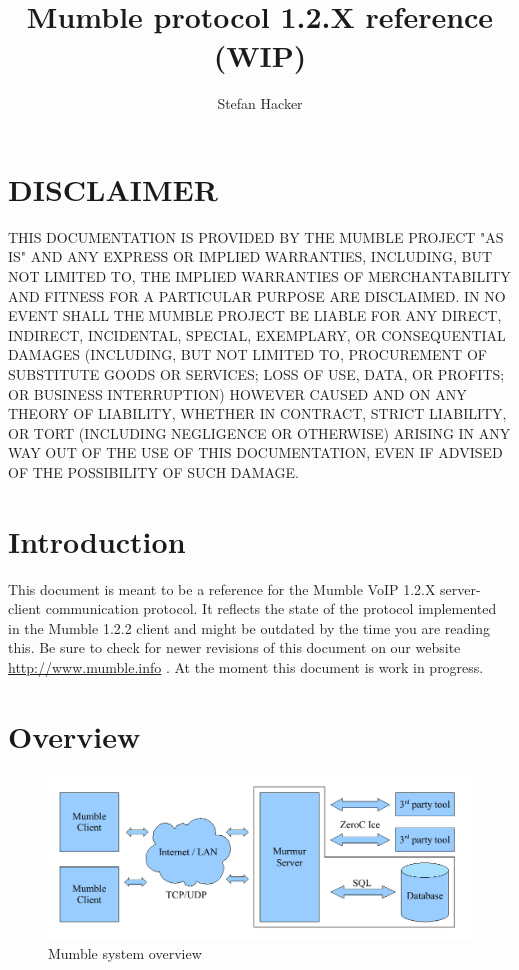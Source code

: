 \documentclass[11pt]{article} %
\title{Mumble protocol 1.2.X reference (WIP)}
\author{Stefan Hacker}
\begin{document}
\maketitle

\newpage
\section*{DISCLAIMER}

THIS DOCUMENTATION IS PROVIDED BY THE MUMBLE PROJECT "AS IS" AND ANY EXPRESS OR IMPLIED WARRANTIES, INCLUDING, BUT NOT LIMITED TO, THE IMPLIED WARRANTIES OF MERCHANTABILITY AND FITNESS FOR A PARTICULAR PURPOSE ARE DISCLAIMED. IN NO EVENT SHALL THE MUMBLE PROJECT BE LIABLE FOR ANY DIRECT, INDIRECT, INCIDENTAL, SPECIAL, EXEMPLARY, OR CONSEQUENTIAL DAMAGES (INCLUDING, BUT NOT LIMITED TO, PROCUREMENT OF SUBSTITUTE GOODS OR SERVICES; LOSS OF USE, DATA, OR PROFITS; OR BUSINESS INTERRUPTION) HOWEVER CAUSED AND ON ANY THEORY OF LIABILITY, WHETHER IN CONTRACT, STRICT LIABILITY, OR TORT (INCLUDING NEGLIGENCE OR OTHERWISE) ARISING IN ANY WAY OUT OF THE USE OF THIS DOCUMENTATION, EVEN IF ADVISED OF THE POSSIBILITY OF SUCH DAMAGE. 

\tableofcontents
\newpage

\section{Introduction}
This document is meant to be a reference for the Mumble VoIP 1.2.X server-client communication protocol. It reflects the state of the protocol implemented in the Mumble 1.2.2 client and might be outdated by the time you are reading this. Be sure to check for newer revisions of this document on our website \url{http://www.mumble.info} . At the moment this document is work in progress.

\section{Overview}

\begin{figure}[ht]
	\centering
	\includegraphics[width=\linewidth]{resources/mumble_system_overview}
	\caption{Mumble system overview}
	\label{fig:mumble_system_overview}
\end{figure}
\end{document}
